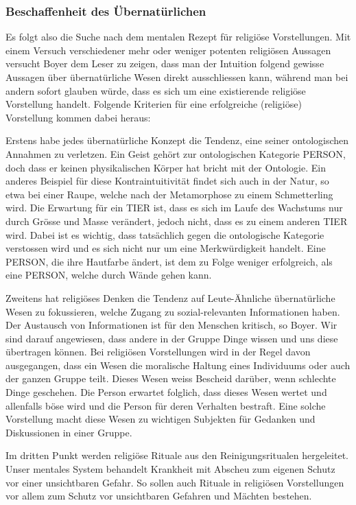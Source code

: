 \subsubsection{Beschaffenheit des Übernatürlichen}
Es folgt also die Suche nach dem mentalen Rezept für religiöse Vorstellungen. Mit einem Versuch verschiedener mehr oder weniger potenten religiösen Aussagen versucht Boyer dem Leser zu zeigen, dass man der Intuition folgend gewisse Aussagen über übernatürliche Wesen direkt ausschliessen kann, während man bei andern sofort glauben würde, dass es sich um eine existierende religiöse Vorstellung handelt. Folgende Kriterien für eine erfolgreiche (religiöse) Vorstellung kommen dabei heraus: 

Erstens habe jedes übernatürliche Konzept die Tendenz, eine seiner ontologischen Annahmen zu verletzen. Ein Geist gehört zur ontologischen Kategorie PERSON, doch dass er keinen physikalischen Körper hat bricht mit der Ontologie. Ein anderes Beispiel für diese Kontraintuitivität findet sich auch in der Natur, so etwa bei einer Raupe, welche nach der Metamorphose zu einem Schmetterling wird. Die Erwartung für ein TIER ist, dass es sich im Laufe des Wachstums nur durch Grösse und Masse verändert, jedoch nicht, dass es zu einem anderen TIER wird. Dabei ist es wichtig, dass tatsächlich gegen die ontologische Kategorie verstossen wird und es sich nicht nur um eine Merkwürdigkeit handelt. Eine PERSON, die ihre Hautfarbe ändert, ist dem zu Folge weniger erfolgreich, als eine PERSON, welche durch Wände gehen kann. 

Zweitens hat religiöses Denken die Tendenz auf Leute-Ähnliche übernatürliche Wesen zu fokussieren, welche Zugang zu sozial-relevanten Informationen haben. Der Austausch von Informationen ist für den Menschen kritisch, so Boyer. Wir sind darauf angewiesen, dass andere in der Gruppe Dinge wissen und uns diese übertragen können. Bei religiösen Vorstellungen wird in der Regel davon ausgegangen, dass ein Wesen die moralische Haltung eines Individuums oder auch der ganzen Gruppe teilt. Dieses Wesen weiss Bescheid darüber, wenn schlechte Dinge geschehen. Die Person erwartet folglich, dass dieses Wesen wertet und allenfalls böse wird und die Person für deren Verhalten bestraft. Eine solche Vorstellung macht diese Wesen zu wichtigen Subjekten für Gedanken und Diskussionen in einer Gruppe. 

Im dritten Punkt werden religiöse Rituale aus den Reinigungsritualen hergeleitet. Unser mentales System behandelt Krankheit mit Abscheu zum eigenen Schutz vor einer unsichtbaren Gefahr. So sollen auch Rituale in religiösen Vorstellungen vor allem zum Schutz vor unsichtbaren Gefahren und Mächten bestehen. 

